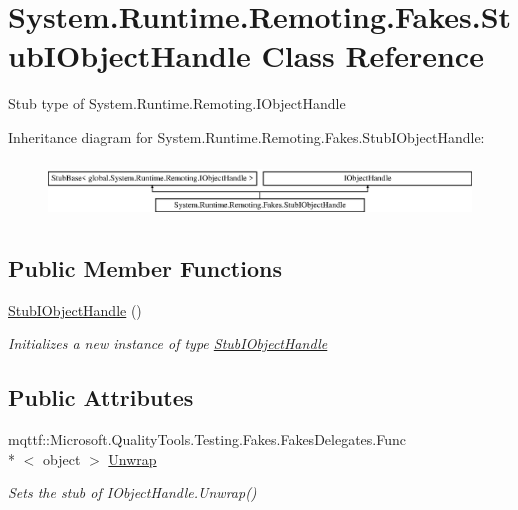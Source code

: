 \hypertarget{class_system_1_1_runtime_1_1_remoting_1_1_fakes_1_1_stub_i_object_handle}{\section{System.\-Runtime.\-Remoting.\-Fakes.\-Stub\-I\-Object\-Handle Class Reference}
\label{class_system_1_1_runtime_1_1_remoting_1_1_fakes_1_1_stub_i_object_handle}
}


Stub type of System.\-Runtime.\-Remoting.\-I\-Object\-Handle 


Inheritance diagram for System.\-Runtime.\-Remoting.\-Fakes.\-Stub\-I\-Object\-Handle\-:\begin{figure}[H]
\begin{center}
\leavevmode
\includegraphics[height=1.546961cm]{class_system_1_1_runtime_1_1_remoting_1_1_fakes_1_1_stub_i_object_handle}
\end{center}
\end{figure}
\subsection*{Public Member Functions}
\begin{DoxyCompactItemize}
\item 
\hyperlink{class_system_1_1_runtime_1_1_remoting_1_1_fakes_1_1_stub_i_object_handle_a09a3f4efe6f7e9956da4d63f12531b7b}{Stub\-I\-Object\-Handle} ()
\begin{DoxyCompactList}\small\item\em Initializes a new instance of type \hyperlink{class_system_1_1_runtime_1_1_remoting_1_1_fakes_1_1_stub_i_object_handle}{Stub\-I\-Object\-Handle}\end{DoxyCompactList}\end{DoxyCompactItemize}
\subsection*{Public Attributes}
\begin{DoxyCompactItemize}
\item 
mqttf\-::\-Microsoft.\-Quality\-Tools.\-Testing.\-Fakes.\-Fakes\-Delegates.\-Func\\*
$<$ object $>$ \hyperlink{class_system_1_1_runtime_1_1_remoting_1_1_fakes_1_1_stub_i_object_handle_ad688267804f65bd56774719182f7f278}{Unwrap}
\begin{DoxyCompactList}\small\item\em Sets the stub of I\-Object\-Handle.\-Unwrap()\end{DoxyCompactList}\end{DoxyCompactItemize}


